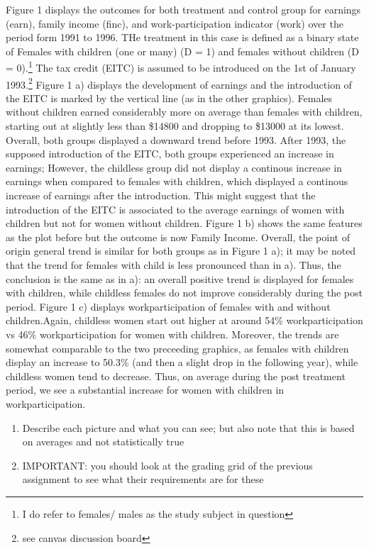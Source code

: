 \documentclass[a4paper]{article}
\begin{document}
Figure 1 displays the outcomes for both treatment and control group for earnings (earn), family income (finc), and work-participation indicator (work) over the period form 1991 to 1996. THe treatment in this case is defined as a binary state of Females with children (one or many) (D = 1) and females without children (D = 0).\footnote{I do refer to females/ males as the study subject in question} The tax credit (EITC) is assumed to be introduced on the 1st of January 1993.\footnote{see canvas discussion board}
\indent Figure 1 a) displays the development of earnings and the introduction of the EITC is marked by the vertical line (as in the other graphics). Females without children earned considerably more on average than females with children, starting out at slightly less than \$14800 and dropping to \$13000 at its lowest. Overall, both groups displayed a downward trend before 1993. After 1993, the supposed introduction of the EITC, both groups experienced an increase in earnings; However, the childless group did not display a continous increase in earnings when compared to females with children, which displayed a continous increase of earnings after the introduction. This might suggest that the introduction of the  EITC is associated to the average earnings of women with children but not for women without children.
\indent Figure 1 b) shows the same features as the plot before but the outcome is now Family Income. Overall, the point of origin general trend is similar for both groups as in Figure 1 a); it may be noted that the trend for females with child is less pronounced than in a). Thus, the conclusion is the same as in a): an overall positive trend is displayed for females with children, while childless females do not improve considerably during the post period. 
\indent Figure 1 c) displays workparticipation of females with and without children.Again, childless women start out higher at around 54\% workparticipation vs 46\% workparticipation for women with children. Moreover, the trends are somewhat comparable to the two preceeding graphics, as females with children display an increase to 50.3\% (and then a slight drop in the following year), while childless women tend to decrease. Thus, on average during the post treatment period, we see a substantial increase for women with children in workparticipation.






\begin{enumerate}
   \item Describe each picture and what you can see; but also note that this is based on averages and not statistically true
   \item IMPORTANT: you should look at the grading grid of the previous assignment to see what their requirements are for these
\end{enumerate}
\end{document}

